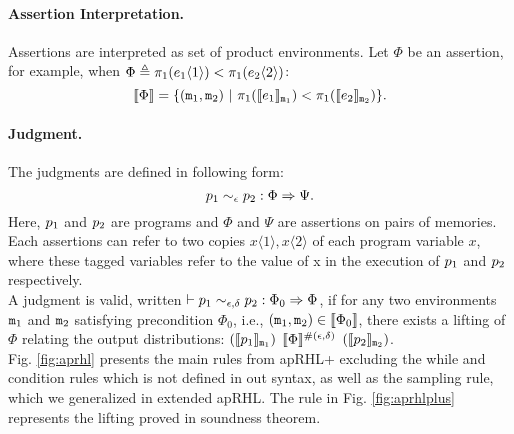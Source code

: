 \documentclass[a4paper,11pt]{article}
\begin{document}
\paragraph{Assertion Interpretation.} Assertions are interpreted as set of product environments. Let $\Phi$ be an assertion,
%
for example, when $\Phi \triangleq \pi_1(e_1\langle 1 \rangle) < \pi_1(e_2\langle 2 \rangle)$:
\[
	\llbracket \Phi \rrbracket = \{(\mathtt{m}_1, \mathtt{m}_2)
	~|~ \pi_1(\llbracket e_1 \rrbracket_{\mathtt{m}_1}) 
	< \pi_1(\llbracket e_2 \rrbracket_{\mathtt{m}_2}) \}.
\]
%
%
\paragraph{Judgment.}
The judgments are defined in following form:
\[
	p_1 \sim_{\epsilon} p_2: \Phi \Rightarrow \Psi.
\]
Here, $p_1$ and $p_2$ are programs and $\Phi$ and $\Psi$ are assertions on pairs of memories. Each assertions can refer to two copies $x\langle 1 \rangle, x\langle 2 \rangle$ of each program variable $x$, where these tagged variables refer to the value of x in the execution of $p_1$ and $p_2$ respectively.
%
\\
A judgment is valid, written $\vdash p_1 \sim_{\epsilon, \delta} p_2: \Phi_0 \Rightarrow \Phi$, 
if for any two environments $\mathtt{m}_1$ and $\mathtt{m}_2$ satisfying precondition $\Phi_0$, 
i.e., $(\mathtt{m}_1, \mathtt{m}_2) \in \llbracket \Phi_0 \rrbracket$, there exists a lifting of $\Phi$ relating the output distributions: 
%
$(\llbracket p_1 \rrbracket_{\mathtt{m}_1})$ 
$\llbracket \Phi \rrbracket^{\#(\epsilon, \delta)}$ 
$(\llbracket p_2 \rrbracket_{\mathtt{m}_2})$.
%
\\
%
Fig. \ref{fig:aprhl} presents the main rules from apRHL+ \cite{barthe2016proving} excluding the while and condition rules which is not defined in out syntax, as well as the sampling rule, which we generalized in extended apRHL.
The rule in Fig. \ref{fig:aprhlplus} represents the lifting proved in soundness theorem.
%
\end{document}

